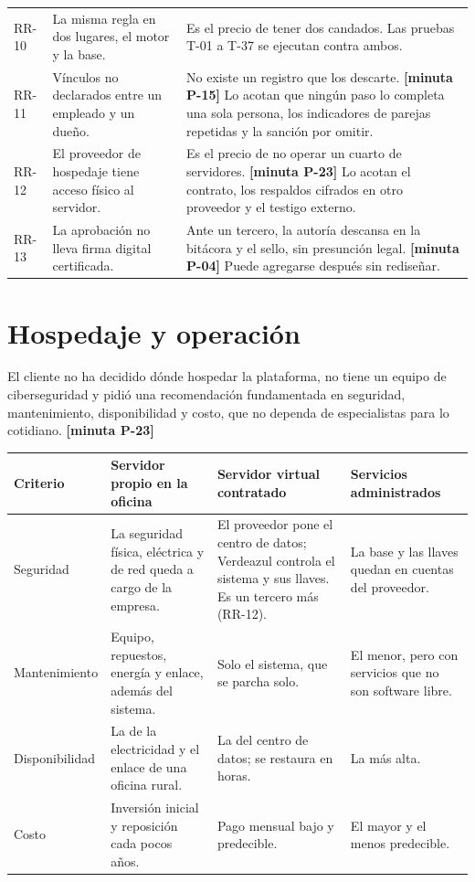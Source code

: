 \documentclass[11pt,letterpaper]{article}
\newcommand{\cab}[1]{\textbf{\rmfamily #1}}
\newcommand{\resp}[1]{\textrm{\footnotesize\bfseries [minuta #1]}}
\begin{document}
{\begin{longtable}{@{}L{1.25cm} L{4.9cm} L{9.5cm}@{}}
RR-10 & La misma regla en dos lugares, el motor y la base. & Es el precio de tener dos candados. Las pruebas T-01 a T-37 se ejecutan contra ambos. \\
RR-11 & Vínculos no declarados entre un empleado y un dueño. & No existe un registro que los descarte. \resp{P-15} Lo acotan que ningún paso lo completa una sola persona, los indicadores de parejas repetidas y la sanción por omitir. \\
RR-12 & El proveedor de hospedaje tiene acceso físico al servidor. & Es el precio de no operar un cuarto de servidores. \resp{P-23} Lo acotan el contrato, los respaldos cifrados en otro proveedor y el testigo externo. \\
RR-13 & La aprobación no lleva firma digital certificada. & Ante un tercero, la autoría descansa en la bitácora y el sello, sin presunción legal. \resp{P-04} Puede agregarse después sin rediseñar. \\
\end{longtable}
}

\section{Hospedaje y operación}
\label{sec:hospedaje}

El cliente no ha decidido dónde hospedar la plataforma, no tiene un equipo de ciberseguridad y pidió
una recomendación fundamentada en seguridad, mantenimiento, disponibilidad y costo, que no dependa de
especialistas para lo cotidiano. \resp{P-23}

\begin{center}
\small
\renewcommand{\arraystretch}{1.14}
\begin{tabularx}{\textwidth}{@{}L{2.3cm} Y Y Y@{}}
\toprule
\cab{Criterio} & \cab{Servidor propio en la oficina} & \cab{Servidor virtual contratado} & \cab{Servicios administrados} \\
\midrule
Seguridad & La seguridad física, eléctrica y de red queda a cargo de la empresa. & El proveedor pone el centro de datos; Verdeazul controla el sistema y sus llaves. Es un tercero más (RR-12). & La base y las llaves quedan en cuentas del proveedor. \\
Mantenimiento & Equipo, repuestos, energía y enlace, además del sistema. & Solo el sistema, que se parcha solo. & El menor, pero con servicios que no son software libre. \\
Disponibilidad & La de la electricidad y el enlace de una oficina rural. & La del centro de datos; se restaura en horas. & La más alta. \\
Costo & Inversión inicial y reposición cada pocos años. & Pago mensual bajo y predecible. & El mayor y el menos predecible. \\
\bottomrule
\end{tabularx}
\end{center}
\end{document}
